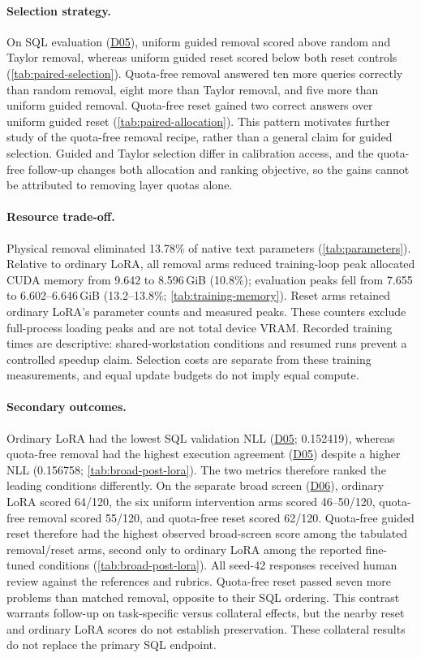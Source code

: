 \documentclass[10pt,letterpaper]{article}
\DeclareRobustCommand{\dataset}[1]{\hyperlink{dataset-#1}{\textnormal{#1}}}
\begin{document}
\paragraph{Selection strategy.}
On SQL evaluation (\dataset{D05}), uniform guided removal scored above random and Taylor removal, whereas
uniform guided reset scored below both reset controls
(\autoref{tab:paired-selection}). Quota-free removal answered ten more
queries correctly than random removal, eight more than Taylor removal,
and five more than uniform guided removal. Quota-free reset gained two
correct answers over uniform guided reset (\autoref{tab:paired-allocation}).
This pattern motivates further study of the quota-free removal recipe,
rather than a general claim for guided selection. Guided and Taylor
selection differ in calibration access, and the quota-free follow-up
changes both allocation and ranking objective, so the gains cannot be
attributed to removing layer quotas alone.

\paragraph{Resource trade-off.}
Physical removal eliminated 13.78\% of native text parameters
(\autoref{tab:parameters}). Relative to ordinary LoRA, all removal arms
reduced training-loop peak allocated CUDA memory from 9.642 to
8.596\,GiB (10.8\%); evaluation peaks fell from 7.655 to
6.602--6.646\,GiB (13.2--13.8\%; \autoref{tab:training-memory}).
Reset arms retained ordinary LoRA's parameter counts and measured peaks.
These counters exclude full-process loading peaks and are not total
device VRAM. Recorded training times are descriptive:
shared-workstation conditions and resumed runs prevent a
controlled speedup claim. Selection costs are separate from these training
measurements, and equal update budgets do not imply equal compute.

\paragraph{Secondary outcomes.}
Ordinary LoRA had the lowest SQL validation NLL (\dataset{D05}; 0.152419), whereas
quota-free removal had the highest execution agreement (\dataset{D05}) despite a higher
NLL (0.156758; \autoref{tab:broad-post-lora}). The two metrics therefore
ranked the leading conditions differently.
On the separate broad screen (\dataset{D06}), ordinary LoRA scored 64/120, the six uniform
intervention arms scored 46--50/120, quota-free removal scored 55/120,
and quota-free reset scored 62/120. Quota-free guided reset therefore had
the highest observed broad-screen score among the tabulated removal/reset arms,
second only to ordinary LoRA among the reported fine-tuned conditions
(\autoref{tab:broad-post-lora}). All seed-42 responses received human review
against the references and rubrics.
Quota-free reset passed seven more problems than matched removal,
opposite to their SQL ordering. This contrast warrants follow-up on
task-specific versus collateral effects, but the nearby reset and ordinary
LoRA scores do not establish preservation. These collateral results do
not replace the primary SQL endpoint.
\end{document}
